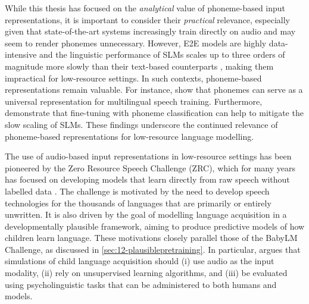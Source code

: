 While this thesis has focused on the \emph{analytical} value of phoneme-based input representations, it is important to consider their \emph{practical} relevance, especially given that state-of-the-art systems increasingly train directly on audio and may seem to render phonemes unnecessary. However, E2E models are highly data-intensive \citep{li2022recent} and the linguistic performance of SLMs scales up to three orders of magnitude more slowly than their text-based counterparts \citep{cuervo2024scaling}, making them impractical for low-resource settings. In such contexts, phoneme-based representations remain valuable. For instance, \citet{feng-2023-language-universal-phonetic} show that phonemes can serve as a universal representation for multilingual speech training. Furthermore, \citet{poli2024improving} demonstrate that fine-tuning with phoneme classification can help to mitigate the slow scaling of SLMs. These findings underscore the continued relevance of phoneme-based representations for low-resource language modelling.



The use of audio-based input representations in low-resource settings has been pioneered by the Zero Resource Speech Challenge (ZRC), which for many years has focused on developing models that learn directly from raw speech without labelled data \citep[see][for an overview]{dunbar2022self}. The challenge is motivated by the need to develop speech technologies for the thousands of languages that are primarily or entirely unwritten. It is also driven by the goal of modelling language acquisition in a developmentally plausible framework, aiming to produce predictive models of how children learn language. These motivations closely parallel those of the BabyLM Challenge, as discussed in \cref{sec:12-plausiblepretraining}. In particular, \citet{dupoux-2018-cognitive} argues that simulations of child language acquisition should (i) use audio as the input modality, (ii) rely on unsupervised learning algorithms, and (iii) be evaluated using psycholinguistic tasks that can be administered to both humans and models.

